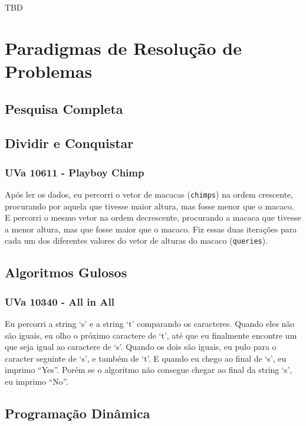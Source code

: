 \documentclass[11pt]{scrartcl}
\newcommand{\code}[1]{\texttt{\colorbox{bg_code_color}{#1}}}
\begin{document}
TBD

\section{Paradigmas de Resolução de Problemas}

\subsection{Pesquisa Completa}

\subsection{Dividir e Conquistar}
\subsubsection{UVa 10611 - Playboy Chimp}
Após ler os dados, eu percorri o vetor de macacas (\code{chimps}) na ordem crescente, procurando por aquela que tivesse maior altura, mas fosse menor que o macaco. E percorri o mesmo vetor na ordem decrescente, procurando a macaca que tivesse a menor altura, mas que fosse maior que o macaco. Fiz essas duas iterações para cada um dos diferentes valores do vetor de alturas do macaco (\code{queries}).


\subsection{Algoritmos Gulosos}
\subsubsection{UVa 10340 - All in All}
Eu percorri a string `s' e a string `t' comparando os caracteres. Quando eles não são iguais, eu olho o próximo caractere de `t', até que eu finalmente encontre um que seja igual ao caractere de `s'. Quando os dois são iguais, eu pulo para o caracter seguinte de `s', e também de `t'. E quando eu chego ao final de `s', eu imprimo ``Yes''. Porém se o algoritmo não consegue chegar ao final da string `s', eu imprimo ``No''.


\subsection{Programação Dinâmica}
\end{document}

